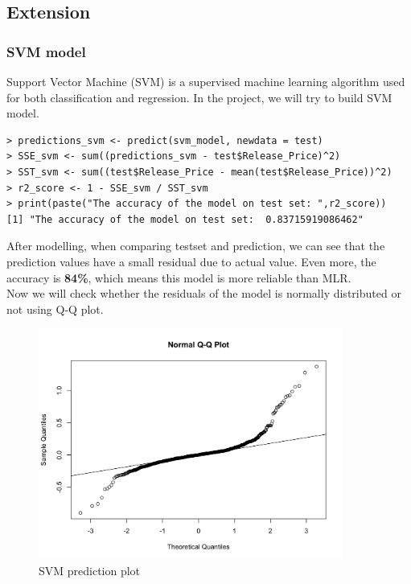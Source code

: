 \documentclass[a4paper]{article}
\theoremstyle{definition}
\begin{document}
\subsection{Extension}
\subsubsection{SVM model}
Support Vector Machine (SVM) is a supervised machine learning algorithm used for both classification and regression. In the project, we will try to build SVM model.

\begin{mdframed}[leftline=false,rightline=false,backgroundcolor=lightblue!10,nobreak=false,numbers=false]
    \begin{verbatim}
> predictions_svm <- predict(svm_model, newdata = test)
> SSE_svm <- sum((predictions_svm - test$Release_Price)^2)
> SST_svm <- sum((test$Release_Price - mean(test$Release_Price))^2)
> r2_score <- 1 - SSE_svm / SST_svm
> print(paste("The accuracy of the model on test set: ",r2_score))
[1] "The accuracy of the model on test set:  0.83715919086462"
\end{verbatim}
\end{mdframed}
After modelling, when comparing test\textunderscore set and prediction, we can see that the prediction values have a small residual due to actual value. Even more, the accuracy is \textbf{84\%}, which means this model is more reliable than MLR.\\
Now we will check whether the residuals of the model is normally distributed or not using Q-Q plot.
\begin{figure}[h!]
\begin{center}
\includegraphics[width=10cm]{images/qqsvm.png}
\end{center}
\caption{SVM prediction plot}
\end{figure}
\end{document}
